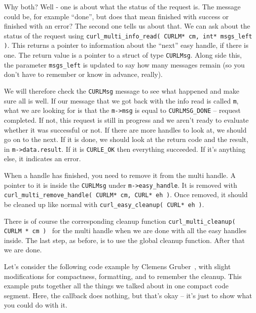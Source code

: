 Why both? Well - one is about what the status of the request is. The message could be, for example ``done'', but does that mean finished with success or finished with an error? The second one tells us about that. We can ask about the status of the request using \texttt{curl\_multi\_info\_read( CURLM* cm, int* msgs\_left )}. This returns a pointer to information about the ``next'' easy handle, if there is one. The return value is a pointer to a struct of type \texttt{CURLMsg}. Along side this, the parameter \texttt{msgs\_left} is updated to say how many messages remain (so you don't have to remember or know in advance, really).

We will therefore check the \texttt{CURLMsg} message to see what happened and make sure all is well. If our message that we got back with the info read is called \texttt{m}, what we are looking for is that the \texttt{m->msg} is equal to \texttt{CURLMSG\_DONE} -- request completed. If not, this request is still in progress and we aren't ready to evaluate whether it was successful or not. If there are more handles to look at, we should go on to the next. If it is done, we should look at the return code and the result, in \texttt{m->data.result}. If it is \texttt{CURLE\_OK} then everything succeeded. If it's anything else, it indicates an error.

When a handle has finished, you need to remove it from the multi handle. A pointer to it is inside the \texttt{CURLMsg} under \texttt{m->easy\_handle}. It is removed with \texttt{curl\_multi\_remove\_handle( CURLM* cm, CURL* eh )}. Once removed, it should be cleaned up like normal with \texttt{curl\_easy\_cleanup( CURL* eh )}.

There is of course the corresponding cleanup function \texttt{curl\_multi\_cleanup( CURLM * cm ) } for the multi handle when we are done with all the easy handles inside. The last step, as before, is to use the global cleanup function. After that we are done.

Let's consider the following code example by Clemens Gruber~\cite{curlmulti}, with slight modifications for compactness, formatting, and to remember the cleanup. This example puts together all the things we talked about in one compact code segment. Here, the callback does nothing, but that's okay -- it's just to show what you could do with it.

